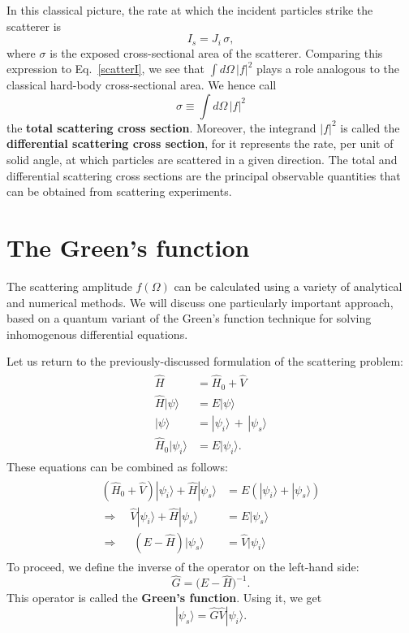 \documentclass[pra,12pt]{revtex4}
\begin{document}
\noindent
In this classical picture, the rate at which the incident particles
strike the scatterer is
\begin{equation}
  I_s = J_i \, \sigma,
\end{equation}
where $\sigma$ is the exposed cross-sectional area of the scatterer.
Comparing this expression to Eq.~\eqref{scatterI}, we see that $\int
d\Omega\,|f|^2$ plays a role analogous to the classical hard-body
cross-sectional area.  We hence call
\begin{equation*}
  \sigma \equiv \int d\Omega\,|f|^2
\end{equation*}
the \textbf{total scattering cross section}.  Moreover, the integrand
$|f|^2$ is called the \textbf{differential scattering cross section},
for it represents the rate, per unit of solid angle, at which
particles are scattered in a given direction.  The total and
differential scattering cross sections are the principal observable
quantities that can be obtained from scattering experiments.

\section{The Green's function}
\label{sec:greensfun}

The scattering amplitude $f(\Omega)$ can be calculated using a variety
of analytical and numerical methods.  We will discuss one particularly
important approach, based on a quantum variant of the Green's function
technique for solving inhomogenous differential equations.

Let us return to the previously-discussed formulation of the
scattering problem:
\begin{align}
  \begin{aligned} \hat{H} &= \hat{H}_0+\hat{V} \\ \hat{H} |\psi\rangle &= E |\psi\rangle \\ |\psi\rangle &= |\psi_i\rangle \,+\, |\psi_s\rangle \\ \hat{H}_0 |\psi_i\rangle &= E |\psi_i\rangle.\end{aligned}
\end{align}
These equations can be combined as follows:
\begin{align}
  \begin{aligned} \left(\hat{H}_0 + \hat{V}\right) |\psi_i\rangle + \hat{H} |\psi_s\rangle &= E \left( |\psi_i\rangle + |\psi_s\rangle \right) \\ \Rightarrow \quad \hat{V} |\psi_i\rangle + \hat{H} |\psi_s\rangle &= E |\psi_s\rangle  \\ \Rightarrow \quad\; \left(E - \hat{H}\right) |\psi_s\rangle & = \hat{V} |\psi_i\rangle
  \end{aligned}
\end{align}
To proceed, we define the inverse of the operator on the left-hand
side:
\begin{equation}
  \hat{G} = \big(E-\hat{H}\big)^{-1}.
\end{equation}
This operator is called the \textbf{Green's function}.  Using it, we
get
\begin{equation}
  |\psi_s\rangle = \hat{G} \hat{V} |\psi_i\rangle.
  \label{scatterform}
\end{equation}
\end{document}
